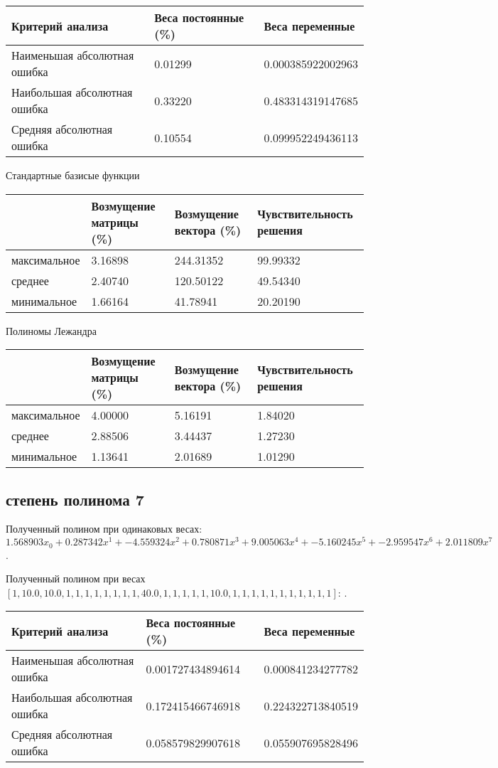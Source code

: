 \documentclass[paper=a4, fontsize=11pt]{scrartcl} %
\numberwithin{equation}{section} %
\numberwithin{figure}{section} %
\numberwithin{table}{section} %
\begin{document}
\begin{tabular}{|p{6 cm}|p{4 cm}|p{4 cm}|}
\hline
	Критерий анализа & Веса постоянные (\%) & Веса переменные\\
\hline
	Наименьшая абсолютная ошибка & 0.01299 & 0.000385922002963\\
\hline
	Наибольшая абсолютная ошибка & 0.33220 & 0.483314319147685\\
\hline
	Средняя абсолютная ошибка & 0.10554 & 0.099952249436113\\
\hline
\end{tabular}

Стандартные базисые функции

\begin{tabular}{|p{3 cm}|p{4 cm}|p{4 cm}|p{3.5 cm}|}
\hline
	& Возмущение матрицы (\%) & Возмущение вектора (\%) & Чувствительность решения\\
\hline
	максимальное & 3.16898 & 244.31352 & 99.99332\\
\hline
	среднее & 2.40740 & 120.50122 & 49.54340\\
\hline
	минимальное & 1.66164 & 41.78941 & 20.20190\\
\hline
\end{tabular}

Полиномы Лежандра

\begin{tabular}{|p{3 cm}|p{4 cm}|p{4 cm}|p{3.5 cm}|}
\hline
& Возмущение матрицы (\%) & Возмущение вектора (\%) & Чувствительность решения\\
\hline
максимальное & 4.00000 & 5.16191 & 1.84020\\
\hline
среднее & 2.88506 & 3.44437 & 1.27230\\
\hline
минимальное & 1.13641 & 2.01689 & 1.01290\\
\hline
\end{tabular}

\subsection{степень полинома 7}

Полученный полином при одинаковых весах: $1.568903x_{0}+ 0.287342x^{1}+ -4.559324x^{2}+ 0.780871x^{3}+ 9.005063x^{4}+ -5.160245x^{5}+ -2.959547x^{6}+ 2.011809x^{7}$.

Полученный полином при весах $[1, 10.0, 10.0, 1, 1, 1, 1, 1, 1, 1, 1, 40.0, 1, 1, 1, 1, 1, 10.0, 1, 1, 1, 1, 1, 1, 1, 1, 1, 1, 1]$: .

\begin{tabular}{|p{6 cm}|p{4 cm}|p{4 cm}|}
\hline
	Критерий анализа & Веса постоянные (\%) & Веса переменные\\
\hline
	Наименьшая абсолютная ошибка & 0.001727434894614 & 0.000841234277782\\
\hline
	Наибольшая абсолютная ошибка & 0.172415466746918 & 0.224322713840519\\
\hline
	Средняя абсолютная ошибка & 0.058579829907618 & 0.055907695828496\\
\hline
\end{tabular}
\end{document}
